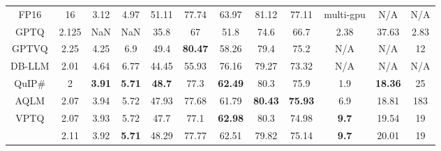 \begin{table}[tbh!]
{\begin{tabular}{c|cccccccc|ccc}
FP16   & 16    & 3.12          & 4.97          & 51.11          & 77.74          & 63.97          & 81.12          & 77.11          & multi-gpu     & N/A            & N/A     \\
GPTQ   & 2.125 & NaN           & NaN           & 35.8           & 67             & 51.8           & 74.6           & 66.7           & 2.38          & 37.63          & 2.83    \\
GPTVQ  & 2.25  & 4.25          & 6.9           & 49.4           & \textbf{80.47} & 58.26          & 79.4           & 75.2           & N/A           & N/A            & 12      \\
DB-LLM & 2.01  & 4.64          & 6.77          & 44.45          & 55.93          & 76.16          & 79.27          & 73.32          & N/A           & N/A            & N/A     \\
QuIP\#\footnotemark[1] & 2     & \textbf{3.91} & \textbf{5.71} & \textbf{48.7}  & 77.3           & \textbf{62.49} & 80.3           & 75.9           & 1.9           & \textbf{18.36} & 25     \\
AQLM\footnotemark[1]   & 2.07  & 3.94          & 5.72          & 47.93          & 77.68          & 61.79          & \textbf{80.43} & \textbf{75.93} & 6.9           & 18.81          & 183     \\
VPTQ   & 2.07  & 3.93          & 5.72          & 47.7           & 77.1           & \textbf{62.98} & 80.3           & 74.98          & \textbf{9.7}  & 19.54          & 19      \\
       & 2.11  & 3.92          & \textbf{5.71} & 48.29          & 77.77          & 62.51          & 79.82          & 75.14          & \textbf{9.7}  & 20.01          & 19      \\ \hline
\end{tabular}
}
\end{table}